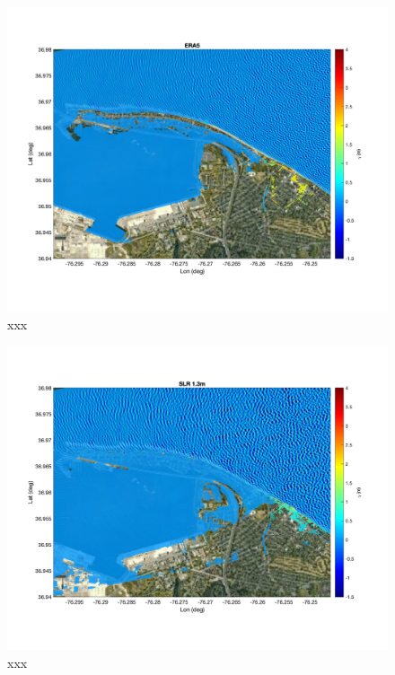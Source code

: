 \documentclass[preprint,12pt,authoryear]{elsarticle}
\begin{document}
\begin{figure}
\centering
\includegraphics[width=\textwidth]{./figures/funwave_ERA5_eta.jpg}
\caption{xxx }
\label{boundary}
\centering
\end{figure}

\begin{figure}
\centering
\includegraphics[width=\textwidth]{./figures/funwave_SLR _eta.jpg}
\caption{xxx }
\label{boundary}
\centering
\end{figure}
\end{document}
